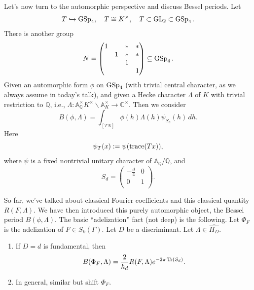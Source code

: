 \documentclass[reqno]{amsart} 
\begin{document}
Let's now turn to the automorphic perspective and discuss Bessel periods.  Let
\begin{equation*}
T \hookrightarrow \operatorname{GSp}_4 , \quad T \cong K^\times, \quad T \subset \operatorname{GL}_2 \subset \operatorname{GSp}_4.
\end{equation*}
There is another group
\begin{equation*}
  N =
  \begin{pmatrix}
1 &  & \ast & \ast \\
 & 1 & \ast & \ast \\
  &  & 1 & \\
& & & 1 \\
\end{pmatrix} \subseteq \operatorname{GSp}_4.
\end{equation*}
Given an automorphic form $\phi$ on $\operatorname{GSp}_4$ (with trivial central character, as we always assume in today's talk), and given a Hecke character $\Lambda$ of $K$ with trivial restriction to $\mathbb{Q}$, i.e., $\Lambda : \mathbb{A}_{\mathbb{Q} }^\times K^\times \backslash \mathbb{A}_K^\times \rightarrow \mathbb{C}^\times$.  Then we consider
\begin{equation*}
  B(\phi, \Lambda ) = \int_{[T N]}
\phi(h) \Lambda(h) \psi_{S_d }(h) \, d h.  
\end{equation*}
Here
\begin{equation*}
\psi_T(x) := \psi(\operatorname{trace}(T x)),
\end{equation*}
where $\psi$ is a fixed nontrivial unitary character of $\mathbb{A}_{\mathbb{Q}} / \mathbb{Q}$, and
\begin{equation*}
S_d =
\begin{pmatrix}
- \frac{d}{4} & 0 \\
0 & 1 \\
\end{pmatrix}.
\end{equation*}

So far, we've talked about classical Fourier coefficients and this classical quantity $R(F, \Lambda)$.  We have then introduced this purely automorphic object, the Bessel period $B(\phi, \Lambda)$.  The basic ``adelization'' fact (not deep) is the following.  Let $\Phi_F$ is the adelization of $F \in S_k(\Gamma)$.  Let $D$ be a discriminant.  Let $\Lambda \in \widehat{H_D}$.
\begin{enumerate}
\item If $D = d$ is fundamental, then
  \begin{equation*}
    B(\Phi_F, \Lambda ) = \frac{2}{h_d}
    R(F, \Lambda) e^{- 2 \pi \operatorname{Tr}(S_d)}.    
  \end{equation*}
\item In general, similar but shift $\Phi_F$.
\end{enumerate}
\end{document}
